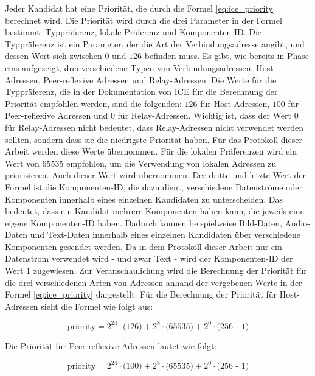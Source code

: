 \noindent Jeder Kandidat hat eine Priorität, die durch die Formel \ref{eq:ice_priority} berechnet wird. Die Priorität wird durch die drei Parameter in der Formel bestimmt: Typpräferenz, lokale Präferenz und Komponenten-ID. Die Typpräferenz ist ein Parameter, der die Art der Verbindungsadresse angibt, und dessen Wert sich zwischen $0$ und $126$ befinden muss. Es gibt, wie bereits in Phase eins aufgezeigt, drei verschiedene Typen von Verbindungsadressen: Host-Adressen, Peer-reflexive Adressen und Relay-Adressen. Die Werte für die Typpräferenz, die in der Dokumentation von ICE für die Berechnung der Priorität empfohlen werden, sind die folgenden: $126$ für Host-Adressen, $100$ für Peer-reflexive Adressen und $0$ für Relay-Adressen. Wichtig ist, dass der Wert $0$ für Relay-Adressen nicht bedeutet, dass Relay-Adressen nicht verwendet werden sollten, sondern dass sie die niedrigste Priorität haben. Für das Protokoll dieser Arbeit werden diese Werte übernommen. Für die lokalen Präferenzen wird ein Wert von $65535$ empfohlen, um die Verwendung von lokalen Adressen zu priorisieren. Auch dieser Wert wird übernommen. Der dritte und letzte Wert der Formel ist die Komponenten-ID, die dazu dient, verschiedene Datenströme oder Komponenten innerhalb eines einzelnen Kandidaten zu unterscheiden. Das bedeutet, dass ein Kandidat mehrere Komponenten haben kann, die jeweils eine eigene Komponenten-ID haben. Dadurch können beispielweise Bild-Daten, Audio-Daten und Text-Daten innerhalb eines einzelnen Kandidaten über verschiedene Komponenten gesendet werden. Da in dem Protokoll dieser Arbeit nur ein Datenstrom verwendet wird - und zwar Text - wird der Komponenten-ID der Wert $1$ zugewiesen. Zur Veranschaulichung wird die Berechnung der Priorität für die drei verschiedenen Arten von Adressen anhand der vergebenen Werte in der Formel \ref{eq:ice_priority} dargestellt. Für die Berechnung der Priorität für Host-Adressen sieht die Formel wie folgt aus:

\begin{equation}
    \label{eq:ice_priority_protocol_host}
    \text{priority} = \text{2}^{24} \cdot \text{(126)} + \text{2}^{8} \cdot \text{(65535)} + \text{2}^{0} \cdot \text{(256 - 1)}
\end{equation}

\noindent Die Priorität für Peer-reflexive Adressen lautet wie folgt:

\begin{equation}
    \label{eq:ice_priority_protocol_reflexive}
    \text{priority} = \text{2}^{24} \cdot \text{(100)} + \text{2}^{8} \cdot \text{(65535)} + \text{2}^{0} \cdot \text{(256 - 1)}
\end{equation}

